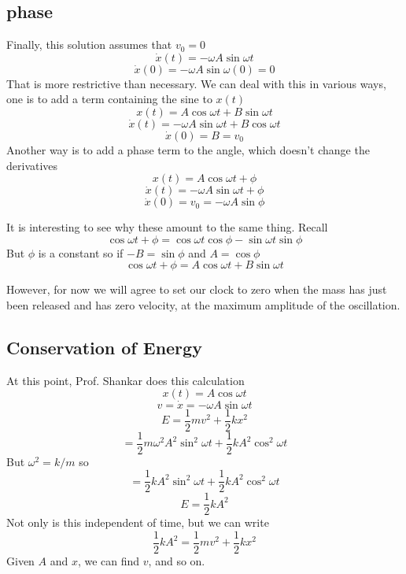 \documentclass[11pt, oneside]{article}
\begin{document}
\subsection*{phase}

Finally, this solution assumes that $v_0 = 0$
\[ \dot{x}(t) = - \omega A \sin \omega t \]
\[ \dot{x}(0) = - \omega A \sin \omega (0) = 0 \]
That is more restrictive than necessary.  We can deal with this in various ways, one is to add a term containing the sine to $x(t)$
\[ x(t) =  A \cos \omega t + B \sin \omega t\]
\[ \dot{x}(t) =  - \omega A \sin \omega t + B \cos \omega t\]
\[ \dot{x}(0) = B = v_0 \]
Another way is to add a phase term to the angle, which doesn't change the derivatives
\[ x(t) =  A \cos \omega t + \phi \]
\[ \dot{x}(t) = - \omega A \sin \omega t + \phi \]
\[ \dot{x}(0) = v_0 = - \omega A \sin \phi \]

It is interesting to see why these amount to the same thing.  Recall
\[ \cos \omega t + \phi = \cos \omega t \cos \phi - \sin \omega t \sin \phi \]
But $\phi$ is a constant so if $-B = \sin \phi$ and $A = \cos \phi$
\[ \cos \omega t + \phi = A \cos \omega t + B \sin \omega t \]

However, for now we will agree to set our clock to zero when the mass has just been released and has zero velocity, at the maximum amplitude of the oscillation.

\subsection*{Conservation of Energy}
At this point, Prof. Shankar does this calculation
\[ x(t) = A \cos \omega t \]
\[ v = \dot{x} = - \omega A \sin \omega t \]
\[ E = \frac{1}{2}mv^2 + \frac{1}{2} kx^2 \]
\[ = \frac{1}{2}m \omega^2 A^2 \sin^2 \omega t + \frac{1}{2} k A^2 \cos^2 \omega t \]
But $\omega^2 = k/m$ so
\[ = \frac{1}{2}k A^2 \sin^2 \omega t + \frac{1}{2} k A^2 \cos^2 \omega t \]
\[ E = \frac{1}{2}k A^2 \]
Not only is this independent of time, but we can write
\[ \frac{1}{2}k A^2 = \frac{1}{2}mv^2 + \frac{1}{2} kx^2 \]
Given $A$ and $x$, we can find $v$, and so on.
\end{document}
